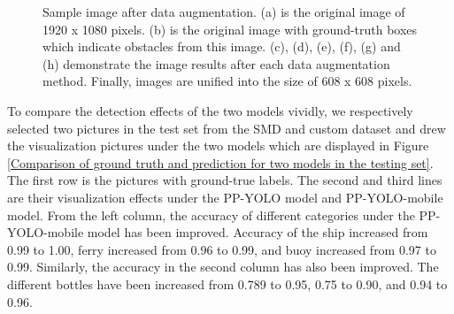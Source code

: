 \documentclass[sensors,article,submit,moreauthors,pdftex]{Definitions/mdpi}
\begin{document}
\begin{figure}[htbp]
{}
\quad
{}
\quad
{}
\quad
{}
\caption{Sample image after data augmentation. (a) is the original image of 1920 x 1080 pixels. (b) is the original image with ground-truth boxes which indicate obstacles from this image. (c), (d), (e), (f), (g) and (h) demonstrate the image results after each data augmentation method. Finally, images are unified into the size of 608 x 608 pixels.
}
\label{fig:data agumentation}
\end{figure}


To compare the detection effects of the two models vividly, we respectively selected two pictures in the test set from the SMD and custom dataset and drew the visualization pictures under the two models which are displayed in Figure \ref{Comparison of ground truth and prediction for two models in the testing set}. The first row is the pictures with ground-true labels. The second and third lines are their visualization effects under the PP-YOLO model and PP-YOLO-mobile model. 
From the left column, the accuracy of different categories under the PP-YOLO-mobile model has been improved. Accuracy of the ship increased from 0.99 to 1.00, ferry increased from 0.96 to 0.99, and buoy increased from 0.97 to 0.99.
Similarly, the accuracy in the second column has also been improved. The different bottles have been increased from 0.789 to 0.95, 0.75 to 0.90, and 0.94 to 0.96.
\end{document}
